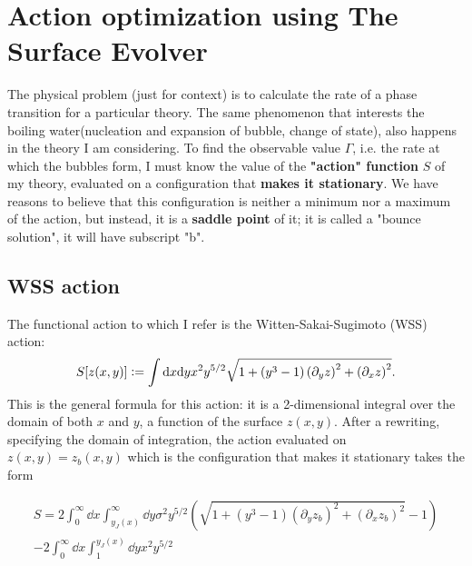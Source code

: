 \documentclass[binding=0.6cm, a4paper]{unifith/unifith}
\theoremstyle{plain}
\theoremstyle{definition}
\newcommand{\deq}{\vcentcolon=}
\begin{document}


\chapter*{Action optimization using The Surface Evolver}

The physical problem (just for context) is to calculate the rate of a phase transition for a particular theory. The same phenomenon that interests the boiling water(nucleation and expansion of bubble, change of state), also happens in the theory I am considering. To find the observable value $\Gamma$, i.e. the rate at which the bubbles form, I must know the value of the \textbf{"action" function} $S$ of my theory, evaluated on a configuration that \textbf{makes it stationary}. We have reasons to believe that this configuration is neither a minimum nor a maximum of the action, but instead, it is a \textbf{saddle point} of it; it is called a "bounce solution", it will have subscript "b".

\section*{WSS action}

The functional action to which I refer is the Witten-Sakai-Sugimoto (WSS) action: 
\begin{equation}
    S[z(x,y)]\deq \int \dd x\dd y x^2 y^{5/2} \sqrt{1+\left(y^3-1\right) \left(\partial_y z\right)^2+\left(\partial_x z\right)^2}.\label{Stilde}
\end{equation}
This is the general formula for this action: it is a 2-dimensional integral over the domain of both $x$ and $y$, a function of the surface $z(x,y)$. After a rewriting, specifying the domain of integration, the action evaluated on $z(x,y)=z_b(x,y)$ which is the configuration that makes it stationary takes the form

\begin{multline}\label{DELTASTILDE}
S=2\int_0^\infty \dd x \int_{y_J(x)}^\infty\dd y \sigma^2 y^{5/2}\left( \sqrt{1+\left(y^3-1\right) \left(\partial_y z_b\right)^2+\left(\partial_x z_b\right)^2}-1\right)\\
-2\int_0^\infty \dd x \int_1^{y_J(x)}\dd y x^2 y^{5/2}
\end{multline}
\end{document}
